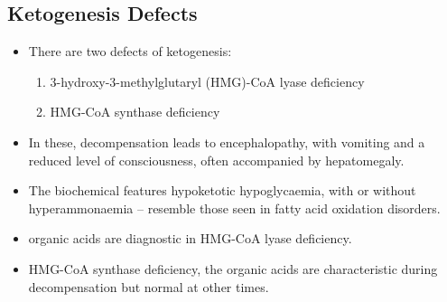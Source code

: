\documentclass{scrartcl}
\begin{document}
\subsection{Ketogenesis Defects}
\label{sec:orgab29059}
\begin{itemize}
\item There are two defects of ketogenesis:
\begin{enumerate}
\item 3-hydroxy-3-methylglutaryl (HMG)-CoA lyase deficiency
\item HMG-CoA synthase deficiency
\end{enumerate}
\item In these, decompensation leads to encephalopathy, with vomiting and
a reduced level of consciousness, often accompanied by hepatomegaly.
\item The biochemical features hypoketotic hypoglycaemia, with or without
hyperammonaemia – resemble those seen in fatty acid oxidation
disorders.
\item organic acids are diagnostic in HMG-CoA lyase deficiency.
\item HMG-CoA synthase deficiency, the organic acids are characteristic
during decompensation but normal at other times.
\end{itemize}
\end{document}
